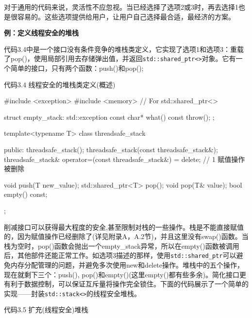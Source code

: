 对于通用的代码来说，灵活性不应忽视。当已经选择了选项2或3时，再去选择1也是很容易的。这些选项提供给用户，让用户自己选择最合适，最经济的方案。

\textbf{例：定义线程安全的堆栈}

代码3.4中是一个接口没有条件竞争的堆栈类定义，它实现了选项1和选项3：重载了pop()，使用局部引用去存储弹出值，并返回\texttt{std::shared\_ptr<>}对象。它有一个简单的接口，只有两个函数：push()和pop();

代码3.4 线程安全的堆栈类定义(概述)

\begin{cpp}
#include <exception>
#include <memory>  // For std::shared_ptr<>

struct empty_stack: std::exception
{
  const char* what() const throw();
};

template<typename T>
class threadsafe_stack
{
public:
  threadsafe_stack();
  threadsafe_stack(const threadsafe_stack&);
  threadsafe_stack& operator=(const threadsafe_stack&) = delete; // 1 赋值操作被删除

  void push(T new_value);
  std::shared_ptr<T> pop();
  void pop(T& value);
  bool empty() const;
};
\end{cpp}

削减接口可以获得最大程度的安全,甚至限制对栈的一些操作。栈是不能直接赋值的，因为赋值操作已经删除了(详见附录A，A.2节)，并且这里没有swap()函数。当栈为空时，pop()函数会抛出一个empty\_stack异常，所以在empty()函数被调用后，其他部件还能正常工作。如选项3描述的那样，使用\texttt{std::shared\_ptr}可以避免内存分配管理的问题，并避免多次使用new和delete操作。堆栈中的五个操作，现在就剩下三个：push(), pop()和empty()(这里empty()都有些多余)。简化接口更有利于数据控制，可以保证互斥量将操作完全锁住。下面的代码展示了一个简单的实现——封装\texttt{std::stack<>}的线程安全堆栈。

代码3.5 扩充(线程安全)堆栈

